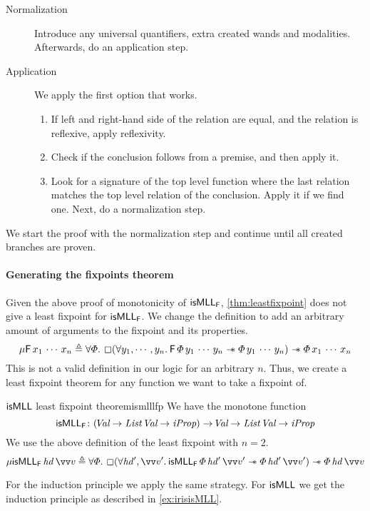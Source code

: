 \documentclass[thesis.tex]{subfiles}
\begin{document}
\begin{description}
  \item[Normalization] Introduce any universal quantifiers, extra created wands and modalities. Afterwards, do an application step.
  \item[Application] We apply the first option that works.
        \begin{enumerate}
          \item If left and right-hand side of the relation are equal, and the relation is reflexive, apply reflexivity.
          \item Check if the conclusion follows from a premise, and then apply it.
          \item Look for a signature of the top level function where the last relation matches the top level relation of the conclusion. Apply it if we find one. Next, do a normalization step.
        \end{enumerate}
\end{description}
We start the proof with the normalization step and continue until all created branches are proven.

\paragraph{Generating the fixpoints theorem}
Given the above proof of monotonicity of $\textsf{\upshape isMLL}_{\textsf{\upshape F}}$, \cref{thm:leastfixpoint} does not give a least fixpoint for $\textsf{\upshape isMLL}_{\textsf{\upshape F}}$. We change the definition to add an arbitrary amount of arguments to the fixpoint and its properties.
\[
  \lfp\hopred\,\var_1\,\cdots\,\var_n \eqdef \All \pred. \always(\All \varB_1,\cdots,\varB_n. \hopred\, \pred\, \varB_1\,\cdots\,\varB_n \wand \pred\, \varB_1\,\cdots\,\varB_n) \wand \pred \, \var_1\,\cdots\,\var_n
\]
This is not a valid definition in our logic for an arbitrary $n$. Thus, we create a least fixpoint theorem for any function we want to take a fixpoint of.
\begin{example}{$\textsf{\upshape isMLL}$ least fixpoint theorem}{ismlllfp}
  We have the monotone function
  \[ \textsf{\upshape isMLL}_{\textsf{\upshape F}}\colon (\kern-0.2em\textit{Val} \to \textit{List}\ \kern-0.2em\textit{Val} \to \textit{iProp}) \to \kern-0.2em\textit{Val} \to \textit{List}\ \kern-0.2em\textit{Val} \to \textit{iProp} \]
  We use the above definition of the least fixpoint with $n = 2$.
  \[ \lfp\isMLL_\hopred\,\hd\,\vect{\val} \eqdef \All \pred. \always(\All \hd',\vect{\val}'. \isMLL_\hopred\, \pred\, \hd'\, \vect{\val}' \wand \pred\, \hd'\, \vect{\val}') \wand \pred\, \hd\, \vect{\val} \]
\end{example}
For the induction principle we apply the same strategy. For $\textsf{\upshape isMLL}$ we get the induction principle as described in \cref{ex:irisisMLL}.
\end{document}
